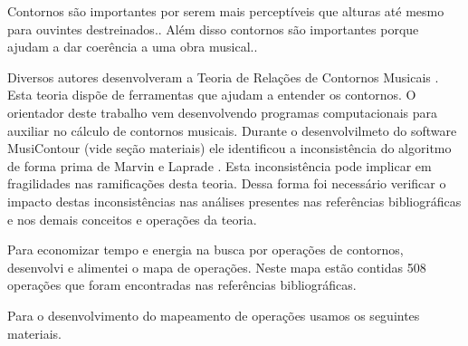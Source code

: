 \documentclass[11pt]{article}
\begin{document}
Contornos são importantes por serem mais perceptíveis que alturas até
mesmo para ouvintes destreinados.\cite[p. 225]{Marvin1987}.
Além disso contornos são importantes porque ajudam
a dar coerência a uma obra musical.\cite[p. 225]{Clifford1995}.

Diversos autores desenvolveram a Teoria de Relações de Contornos
Musicais \cite{Friedmann1985, Friedmann1987, Morris1987, Marvin1987,
  Marvin1988, Polansky1992, Morris1993, Clifford1995, Quinn1997,
  Beard2003, Sampaio2008, Schultz2008, Schultz2009, Bor2009}. Esta
teoria dispõe de ferramentas que ajudam a entender os contornos. O
orientador deste trabalho vem desenvolvendo programas computacionais
para auxiliar no cálculo de contornos musicais. Durante o
desenvolvilmeto do software
MusiContour (vide seção materiais) ele identificou a inconsistência
do algoritmo de forma prima de Marvin e Laprade \cite{Marvin1987}.
Esta inconsistência pode implicar em fragilidades nas ramificações
desta teoria.
Dessa forma foi necessário verificar o
impacto destas inconsistências nas análises presentes nas referências
bibliográficas e nos demais conceitos e operações da teoria.

Para economizar tempo e energia na busca por operações de contornos,
desenvolvi e alimentei o mapa de operações.
Neste mapa estão contidas 508 operações que foram
encontradas nas referências bibliográficas.

\label{sec:materiais}

Para o desenvolvimento do mapeamento de operações usamos os seguintes
materiais.
\end{document}
